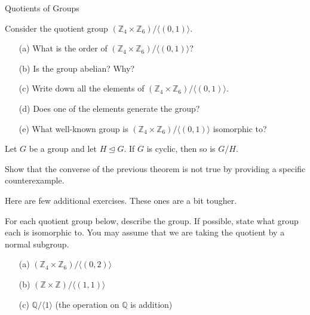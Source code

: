 \begin{section}{Quotients of Groups}
\begin{exercise}
Consider the quotient group $(\mathbb{Z}_4\times \mathbb{Z}_6)/\langle (0,1)\rangle$.
\begin{enumerate}
\item[(a)] What is the order of $(\mathbb{Z}_4\times \mathbb{Z}_6)/\langle (0,1)\rangle$?
\item[(b)] Is the group abelian?  Why?
\item[(c)] Write down all the elements of $(\mathbb{Z}_4\times \mathbb{Z}_6)/\langle (0,1)\rangle$.
\item[(d)] Does one of the elements generate the group?
\item[(e)] What well-known group is $(\mathbb{Z}_4\times \mathbb{Z}_6)/\langle (0,1)\rangle$ isomorphic to?
\end{enumerate}
\end{exercise}

\begin{theorem}
Let $G$ be a group and let $H\trianglelefteq G$.  If $G$ is cyclic, then so is $G/H$.
\end{theorem}

\begin{problem}
Show that the converse of the previous theorem is not true by providing a specific counterexample.
\end{problem}

Here are few additional exercises.  These ones are a bit tougher.

\begin{exercise}
For each quotient group below, describe the group.  If possible, state what group each is isomorphic to.  You may assume that we are taking the quotient by a normal subgroup. 
\begin{enumerate}
\item[(a)] $(\mathbb{Z}_4\times \mathbb{Z}_6)/\langle (0,2)\rangle$
\item[(b)] $(\mathbb{Z}\times \mathbb{Z})/\langle (1,1)\rangle$
\item[(c)] $\mathbb{Q}/\langle 1\rangle$ (the operation on $\mathbb{Q}$ is addition)
\end{enumerate}
\end{exercise}

\end{section}